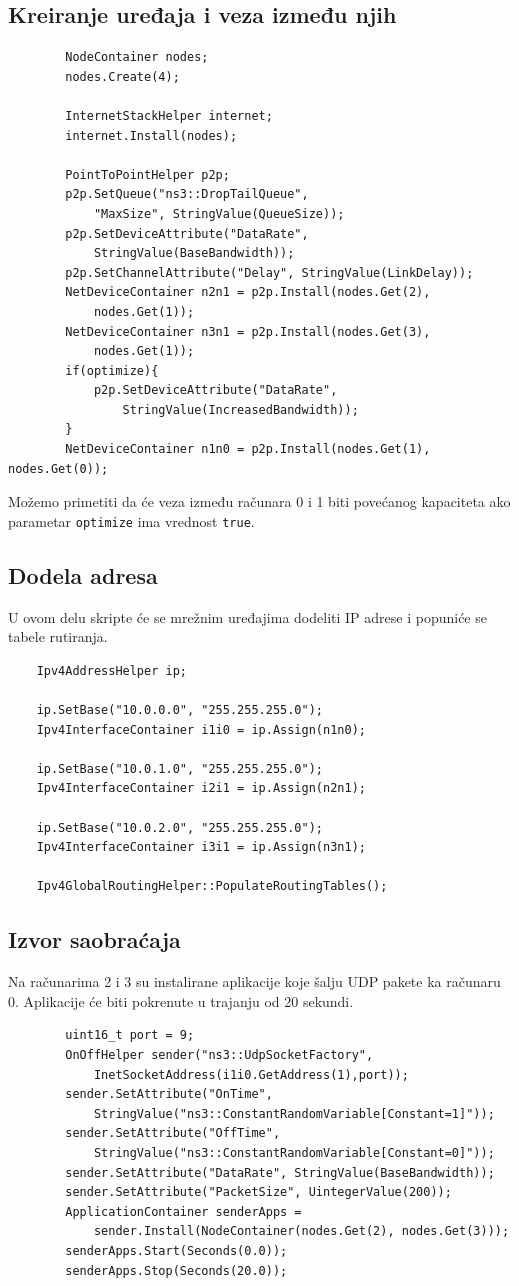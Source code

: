 \documentclass[a4paper, 12pt, projekat]{etf}
\begin{document}
	\subsection{Kreiranje uređaja i veza između njih}
	\begin{verbatim}
		NodeContainer nodes;
		nodes.Create(4);
		
		InternetStackHelper internet;
		internet.Install(nodes);
		
		PointToPointHelper p2p;
		p2p.SetQueue("ns3::DropTailQueue",
		    "MaxSize", StringValue(QueueSize));
		p2p.SetDeviceAttribute("DataRate", 
		    StringValue(BaseBandwidth));
		p2p.SetChannelAttribute("Delay", StringValue(LinkDelay));
		NetDeviceContainer n2n1 = p2p.Install(nodes.Get(2), 
		    nodes.Get(1));
		NetDeviceContainer n3n1 = p2p.Install(nodes.Get(3), 
		    nodes.Get(1));
		if(optimize){
			p2p.SetDeviceAttribute("DataRate", 
			    StringValue(IncreasedBandwidth));
		}
		NetDeviceContainer n1n0 = p2p.Install(nodes.Get(1), nodes.Get(0));
	\end{verbatim}
	
	Možemo primetiti da će veza između računara 0 i 1 biti povećanog ka\-pa\-citeta ako parametar \verb|optimize| ima vrednost \verb|true|.
	\subsection{Dodela adresa}
	U ovom delu skripte će se mrežnim uređajima dodeliti IP adrese i po\-puniće se tabele rutiranja.
	\begin{verbatim}
	Ipv4AddressHelper ip;
	
	ip.SetBase("10.0.0.0", "255.255.255.0");
	Ipv4InterfaceContainer i1i0 = ip.Assign(n1n0);
	
	ip.SetBase("10.0.1.0", "255.255.255.0");
	Ipv4InterfaceContainer i2i1 = ip.Assign(n2n1);
	
	ip.SetBase("10.0.2.0", "255.255.255.0");
	Ipv4InterfaceContainer i3i1 = ip.Assign(n3n1);
	
	Ipv4GlobalRoutingHelper::PopulateRoutingTables();
	\end{verbatim}
	\subsection{Izvor saobraćaja}
	Na računarima 2 i 3 su instalirane aplikacije koje šalju UDP pakete ka računaru 0. Aplikacije će biti pokrenute u trajanju od 20 sekundi.
	\begin{verbatim}
		uint16_t port = 9;
		OnOffHelper sender("ns3::UdpSocketFactory",
		    InetSocketAddress(i1i0.GetAddress(1),port));
		sender.SetAttribute("OnTime", 
		    StringValue("ns3::ConstantRandomVariable[Constant=1]"));
		sender.SetAttribute("OffTime", 
		    StringValue("ns3::ConstantRandomVariable[Constant=0]"));
		sender.SetAttribute("DataRate", StringValue(BaseBandwidth));
		sender.SetAttribute("PacketSize", UintegerValue(200));
		ApplicationContainer senderApps = 
		    sender.Install(NodeContainer(nodes.Get(2), nodes.Get(3)));
		senderApps.Start(Seconds(0.0));
		senderApps.Stop(Seconds(20.0));
	\end{verbatim}
\end{document}
